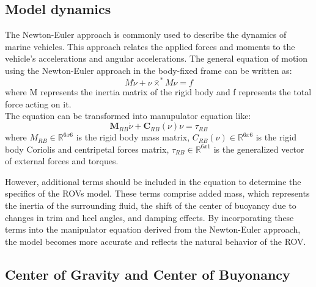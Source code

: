 \subsection{Model dynamics}

    The Newton-Euler approach is commonly used to describe the dynamics of marine vehicles.
    This approach relates the applied forces and moments to the vehicle's accelerations and angular accelerations.
    The general equation of motion using the Newton-Euler approach in the body-fixed frame can be written as:
    $$
    M\dot\nu+\nu\bar{\times}^*M\nu=f
    $$
    where M represents the inertia matrix of the rigid body and 
    f represents the total force acting on it.\\
    The equation can be transformed into manupulator equation like:
    $$
     \mathbf{M}_{R B} \dot{\nu}+\mathbf{C}_{R B}(\nu) \nu
    =\tau_{R B}
    $$
    where
    $M_{R B} \in \mathbb{R}^{6 x 6}$ is the rigid body mass matrix,
    $C_{R B}(\nu) \in \mathbb{R}^{6 x 6}$ is the rigid body Coriolis and centripetal forces matrix,
    $\tau_{R B} \in \mathbb{R}^{6 x 1}$ is the generalized vector of external forces and torques.
    
    However, additional terms should be included in the equation to determine the specifics of the ROVs model. 
    These terms comprise added mass, which represents the inertia of the surrounding fluid, the shift of the 
    center of buoyancy due to changes in trim and heel angles, and damping effects. 
    By incorporating these terms into the manipulator equation derived from the Newton-Euler approach, 
    the model becomes more accurate and reflects the natural behavior of the ROV.    

\subsection{Center of Gravity and Center of Buyonancy}
    
